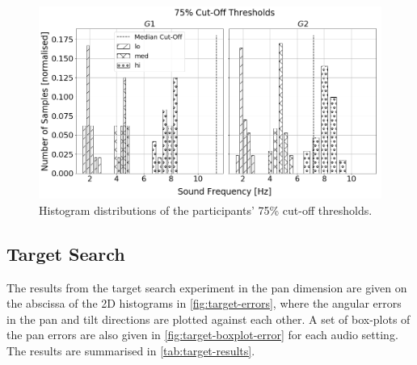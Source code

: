 \documentclass{article}
\begin{document}
\begin{figure}
  \centering
  \includegraphics[width=1.0\textwidth]{figures/pitch_thresholds_limits.png}
  \caption{Histogram distributions of the participants' 75\% cut-off thresholds. }\label{fig:pitch-thresholds-hist}
\end{figure}

\subsection{Target Search}

The results from the target search experiment in the pan dimension are given on the abscissa of the 2D histograms in \cref{fig:target-errors}, where the angular errors in the pan and tilt directions are plotted against each other. 
A set of box-plots of the pan errors are also given in \cref{fig:target-boxplot-error} for each audio setting.
The results are summarised in \cref{tab:target-results}.
\end{document}

